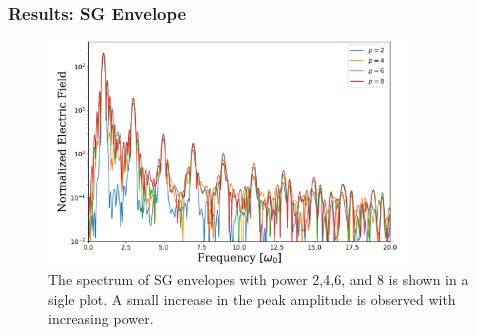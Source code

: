 \documentclass{beamer}
\begin{document}
\begin{frame}
    \frametitle{Results: SG Envelope}
    \begin{figure}[h]
        \centering
        \includegraphics[width=0.85\textwidth]{images/sg_2.png}
        \caption{The spectrum of SG envelopes with power 2,4,6, and 8 is shown in a sigle plot. A small increase in the peak amplitude is observed with increasing power.}
        \label{fig:sg}
    \end{figure}
\end{frame}
\end{document}
